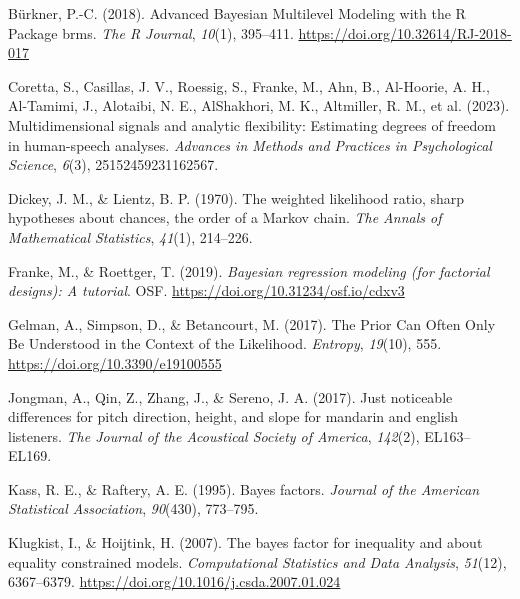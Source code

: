 \documentclass[
  doc,
  floatsintext,
  longtable,
  nolmodern,
  notxfonts,
  notimes,
  colorlinks=true,linkcolor=blue,citecolor=blue,urlcolor=blue]{apa7}
\newlength{\cslhangindent}
\newenvironment{CSLReferences}[2] %
 {\begin{list}{}{%
  \setlength{\itemindent}{0pt}
  \setlength{\leftmargin}{0pt}
  \setlength{\parsep}{0pt}
  \ifodd #1
   \setlength{\leftmargin}{\cslhangindent}
   \setlength{\itemindent}{-1\cslhangindent}
  \fi
  \setlength{\itemsep}{#2\baselineskip}}}
 {\end{list}}
\begin{document}
\label{refs}
\begin{CSLReferences}{1}{0}
Bürkner, P.-C. (2018). {Advanced Bayesian Multilevel Modeling with the R
Package brms}. \emph{{The R Journal}}, \emph{10}(1), 395--411.
\url{https://doi.org/10.32614/RJ-2018-017}

Coretta, S., Casillas, J. V., Roessig, S., Franke, M., Ahn, B.,
Al-Hoorie, A. H., Al-Tamimi, J., Alotaibi, N. E., AlShakhori, M. K.,
Altmiller, R. M., et al. (2023). Multidimensional signals and analytic
flexibility: Estimating degrees of freedom in human-speech analyses.
\emph{Advances in Methods and Practices in Psychological Science},
\emph{6}(3), 25152459231162567.

Dickey, J. M., \& Lientz, B. P. (1970). The weighted likelihood ratio,
sharp hypotheses about chances, the order of a {M}arkov chain. \emph{The
Annals of Mathematical Statistics}, \emph{41}(1), 214--226.

Franke, M., \& Roettger, T. (2019). \emph{Bayesian regression modeling
(for factorial designs): {A} tutorial}. OSF.
\url{https://doi.org/10.31234/osf.io/cdxv3}

Gelman, A., Simpson, D., \& Betancourt, M. (2017). The {Prior Can Often
Only Be Understood} in the {Context} of the {Likelihood}.
\emph{Entropy}, \emph{19}(10), 555.
\url{https://doi.org/10.3390/e19100555}

Jongman, A., Qin, Z., Zhang, J., \& Sereno, J. A. (2017). Just
noticeable differences for pitch direction, height, and slope for
mandarin and english listeners. \emph{The Journal of the Acoustical
Society of America}, \emph{142}(2), EL163--EL169.

Kass, R. E., \& Raftery, A. E. (1995). Bayes factors. \emph{Journal of
the American Statistical Association}, \emph{90}(430), 773--795.

Klugkist, I., \& Hoijtink, H. (2007). The bayes factor for inequality
and about equality constrained models. \emph{Computational Statistics
and Data Analysis}, \emph{51}(12), 6367--6379.
\url{https://doi.org/10.1016/j.csda.2007.01.024}


\end{CSLReferences}
\end{document}
